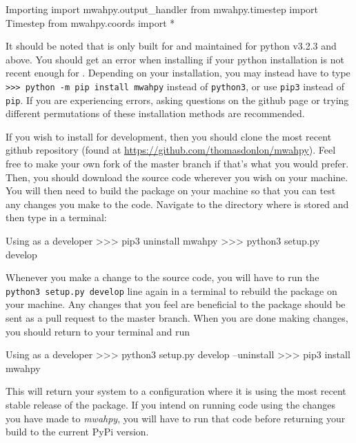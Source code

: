 \documentclass{article}
\begin{document}
\begin{codelisting}{Importing \mwahpy}
import mwahpy.output_handler
from mwahpy.timestep import Timestep
from mwahpy.coords import *
\end{codelisting}

It should be noted that \mwahpy is only built for and maintained for python v3.2.3 and above. You should get an error when installing if your python installation is not recent enough for \mwahpy. Depending on your installation, you may instead have to type \verb!>>> python -m pip install mwahpy! instead of \verb!python3!, or use \verb!pip3! instead of \verb!pip!. If you are experiencing errors, asking questions on the \mwahpy github page or trying different permutations of these installation methods are recommended. 

If you wish to install \mwahpy for development, then you should clone the most recent \mwahpy github repository (found at \url{https://github.com/thomasdonlon/mwahpy}). Feel free to make your own fork of the master branch if that's what you would prefer. Then, you should download the source code wherever you wish on your machine. You will then need to build the \mwahpy package on your machine so that you can test any changes you make to the code. Navigate to the directory where \mwahpy is stored and then type in a terminal: \\

\begin{codelisting}{Using \mwahpy as a developer}
>>> pip3 uninstall mwahpy
>>> python3 setup.py develop
\end{codelisting}

Whenever you make a change to the \mwahpy source code, you will have to run the \verb!python3 setup.py develop! line again in a terminal to rebuild the package on your machine. Any changes that you feel are beneficial to the package should be sent as a pull request to the master branch. When you are done making changes, you should return to your terminal and run \\

\begin{codelisting}{Using \mwahpy as a developer}
>>> python3 setup.py develop --uninstall
>>> pip3 install mwahpy
\end{codelisting}

This will return your system to a configuration where it is using the most recent stable release of the \mwahpy package. If you intend on running code using the changes you have made to \textit{mwahpy}, you will have to run that code before returning your \mwahpy build to the current PyPi version. 
\end{document}
